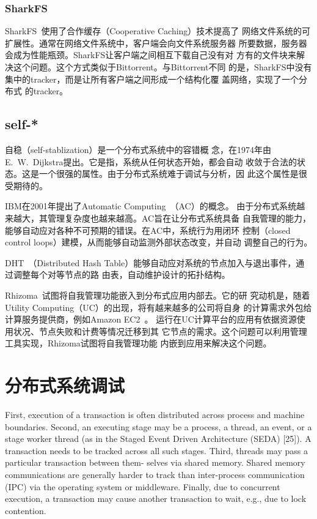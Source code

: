 \subsubsection*{SharkFS}

SharkFS~\cite{sharkfs}使用了合作缓存（Cooperative Caching）技术提高了
网络文件系统的可扩展性。通常在网络文件系统中，客户端会向文件系统服务器
所要数据，服务器会成为性能瓶颈。SharkFS让客户端之间相互下载自己没有对
方有的文件块来解决这个问题。这个方式类似于Bittorrent。与Bittorrent不同
的是，SharkFS中没有集中的tracker，而是让所有客户端之间形成一个结构化覆
盖网络\cite{can, pastry, tapestry, chord, kademlia}，实现了一个分布式
的tracker。

\subsection{self-*}

自稳\cite{Dijkstra1974}（self-stablization）是一个分布式系统中的容错概
念，在1974年由E.\ W.\ Dijkstra提出。它是指，系统从任何状态开始，都会自动
收敛于合法的状态。这是一个很强的属性。由于分布式系统难于调试与分析，因
此这个属性是很受期待的。

IBM在2001年提出了Automatic Computing~\cite{Kephart2003}（AC）的概念。
由于分布式系统越来越大，其管理复杂度也越来越高。AC旨在让分布式系统具备
自我管理的能力，能够自动应对各种不可预期的错误。在AC中，系统行为用闭环
控制（closed control loops）建模，从而能够自动监测外部状态改变，并自动
调整自己的行为。

DHT~\cite{can, pastry, tapestry, chord, kademlia}（Distributed Hash
Table）能够自动应对系统的节点加入与退出事件，通过调整每个对等节点的路
由表，自动维护设计的拓扑结构。

Rhizoma~\cite{Rhizoma}试图将自我管理功能嵌入到分布式应用内部去。它的研
究动机是，随着Utility Computing（UC）的出现，将有越来越多的公司将自身
的计算需求外包给计算服务提供商，例如Amazon EC2~\cite{Garfinkel2007}。
运行在UC计算平台的应用有依据资源使用状况、节点失败和计费等情况迁移到其
它节点的需求。这个问题可以利用管理工具实现，Rhizoma试图将自我管理功能
内嵌到应用来解决这个问题。


\section{分布式系统调试}

First, execution of a transaction is often distributed across process
and machine boundaries. Second, an executing stage may be a process, a
thread, an event, or a stage worker thread (as in the Staged Event
Driven Architecture (SEDA) [25]). A transaction needs to be tracked
across all such stages. Third, threads may pass a particular
transaction between them- selves via shared memory. Shared memory
communications are generally harder to track than inter-process
communication (IPC) via the operating system or middleware. Finally,
due to concurrent execution, a transaction may cause another
transaction to wait, e.g., due to lock contention.


